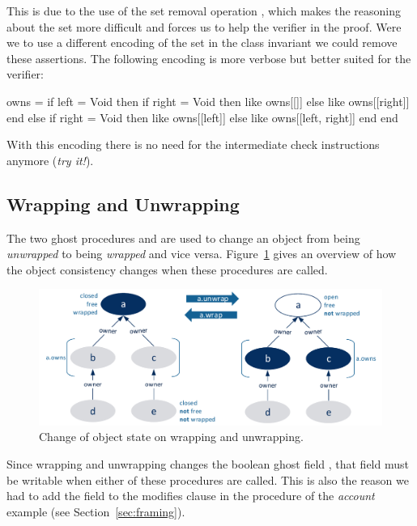 This is due to the use of the set removal operation , which makes the reasoning about the set more difficult and forces us to help the verifier in the proof. Were we to use a different encoding of the  set in the class invariant we could remove these assertions. The following encoding is more verbose but better suited for the verifier:
\begin{erunning}[basicstyle=\footnotesize]
owns =
	if left = Void then
		if right = Void then {like owns}[[]] else {like owns}[[right]] end
	else
		if right = Void then {like owns}[[left]] else {like owns}[[left, right]] end
	end
\end{erunning}
With this encoding there is no need for the intermediate check instructions anymore (\emph{try it!}).

\subsection{Wrapping and Unwrapping} \label{sec:wrapping}

The two ghost procedures  and  are used to change an object from being \emph{unwrapped} to being \emph{wrapped} and vice versa. Figure~\ref{fig:wrapunwrap} gives an overview of how the object consistency changes when these procedures are called. 

\begin{figure}[!htb]
\begin{center}
\includegraphics[width=\columnwidth]{images/wrapunwrap.pdf}
\end{center}
\caption{Change of object state on wrapping and unwrapping.}
\label{fig:wrapunwrap}
\end{figure}

Since wrapping and unwrapping changes the boolean ghost field , that field must be writable when either of these procedures are called. This is also the reason we had to add the field  to the modifies clause in the  procedure of the \emph{account} example (see Section~\ref{sec:framing}).


